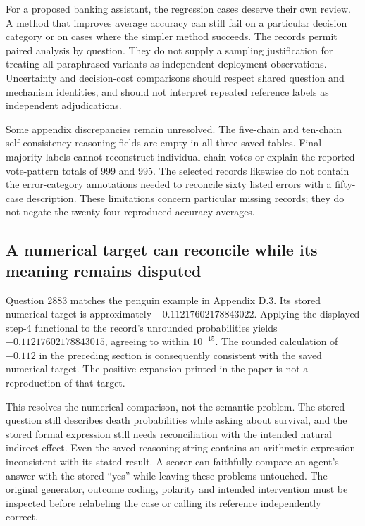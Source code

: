 For a proposed banking assistant, the regression cases deserve their own
review. A method that improves average accuracy can still fail on a particular
decision category or on cases where the simpler method succeeds. The records
permit paired analysis by question. They do not supply a sampling justification
for treating all paraphrased variants as independent deployment observations.
Uncertainty and decision-cost comparisons should respect shared question and
mechanism identities, and should not interpret repeated reference labels as
independent adjudications.

Some appendix discrepancies remain unresolved. The five-chain and ten-chain
self-consistency reasoning fields are empty in all three saved tables. Final
majority labels cannot reconstruct individual chain votes or explain the
reported vote-pattern totals of 999 and 995. The selected records likewise do
not contain the error-category annotations needed to reconcile sixty listed
errors with a fifty-case description. These limitations concern particular
missing records; they do not negate the twenty-four reproduced accuracy
averages.~\citep{exec21_prophets_repo,exec21_prophets_repo_reference}

\subsection{A numerical target can reconcile while its meaning remains disputed}
\label{exec21:prophetsrepo-reference}
Question 2883 matches the penguin example in Appendix D.3. Its stored numerical
target is approximately $-0.11217602178843022$. Applying the displayed
step-4 functional to the record's unrounded probabilities yields
$-0.11217602178843015$, agreeing to within $10^{-15}$. The rounded calculation
of $-0.112$ in the preceding section is consequently consistent with the saved
numerical target. The positive expansion printed in the paper is not a
reproduction of that target.~\citep{exec21_prophets_repo_reference}

This resolves the numerical comparison, not the semantic problem. The stored
question still describes death probabilities while asking about survival, and
the stored formal expression still needs reconciliation with the intended
natural indirect effect. Even the saved reasoning string contains an arithmetic
expression inconsistent with its stated result. A scorer can faithfully compare
an agent's answer with the stored ``yes'' while leaving these problems untouched.
The original generator, outcome coding, polarity and intended intervention
must be inspected before relabeling the case or calling its reference
independently correct.~\citep{exec21_prophets_repo}


